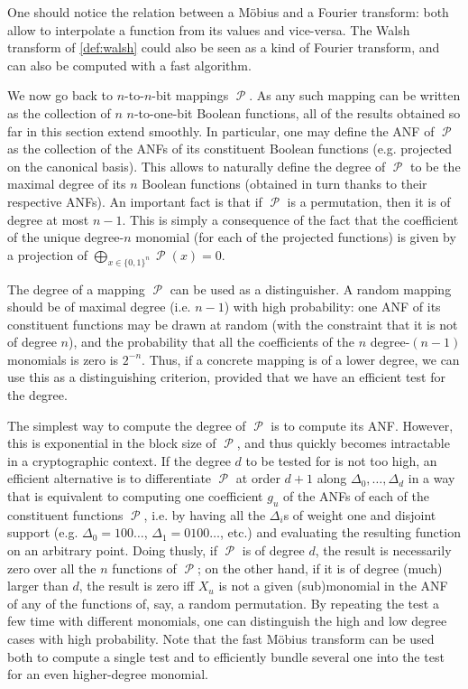 \documentclass[11pt,a4paper]{article}
\theoremstyle{definition}
\theoremstyle{theorem}
\DeclareMathOperator\Perm{\mathcal{P}}
\begin{document}
One should notice the relation between a Möbius and a Fourier transform: both allow to interpolate a function from its values and vice-versa.
The Walsh transform of \autoref{def:walsh} could also be seen as a kind of Fourier transform, and can also be computed with a fast algorithm.

\bigskip

We now go back to $n$-to-$n$-bit mappings $\Perm$. As any such mapping can be written as the collection of $n$ $n$-to-one-bit Boolean functions,
all of the results obtained so far in this section extend smoothly. In particular, one may define the ANF of $\Perm$ as the collection
of the ANFs of its constituent Boolean functions (e.g. projected on the canonical basis). This allows to naturally define the degree
of $\Perm$ to be the maximal degree of its $n$ Boolean functions (obtained in turn thanks to their respective ANFs). An important fact
is that if $\Perm$ is a permutation, then it is of degree at most $n-1$. This is simply a consequence of the fact that the
coefficient of the unique degree-$n$ monomial (for each of the projected functions) is given by a projection
of $\bigoplus_{x \in \{0,1\}^n} \Perm(x) = 0$. 

The degree of a mapping $\Perm$ can be used as a distinguisher. A random mapping should be of maximal degree (i.e. $n-1$) with high
probability: one ANF of its constituent functions may be drawn at random (with the constraint that it is not of degree $n$), and
the probability that all the coefficients of the $n$ degree-$(n-1)$ monomials is zero is $2^{-n}$. Thus, if a concrete mapping
is of a lower degree, we can use this as a distinguishing criterion, provided that we have an efficient test for the degree.

The simplest way to compute the degree of $\Perm$ is to compute its ANF. However, this is exponential in the block size of $\Perm$,
and thus quickly becomes intractable in a cryptographic context. If the degree $d$ to be tested for is not too high, an efficient
alternative is to differentiate $\Perm$ at order $d+1$ along $\Delta_0,\ldots,\Delta_d$ in a way that is equivalent to
computing one coefficient $g_u$ of the ANFs of each of the constituent functions $\Perm$, i.e. by having all the $\Delta_i$s of weight one and disjoint support (e.g.
$\Delta_0 = 100\ldots$, $\Delta_1 = 0100\ldots$, etc.) and evaluating the resulting function
on an arbitrary point. Doing thusly, if $\Perm$ is of degree $d$, the result is necessarily zero
over all the $n$ functions of $\Perm$;
on the other hand, if it is of degree (much) larger than $d$, the result is zero iff $X_u$ is not a given (sub)monomial in the ANF of any of the functions of,
say, a random permutation.
By repeating the test a few time with different monomials, one can distinguish the high and low degree cases with high probability. Note that the fast
Möbius transform can be used both to compute a single test and to efficiently bundle several one into the test for an even higher-degree monomial.
\end{document}
